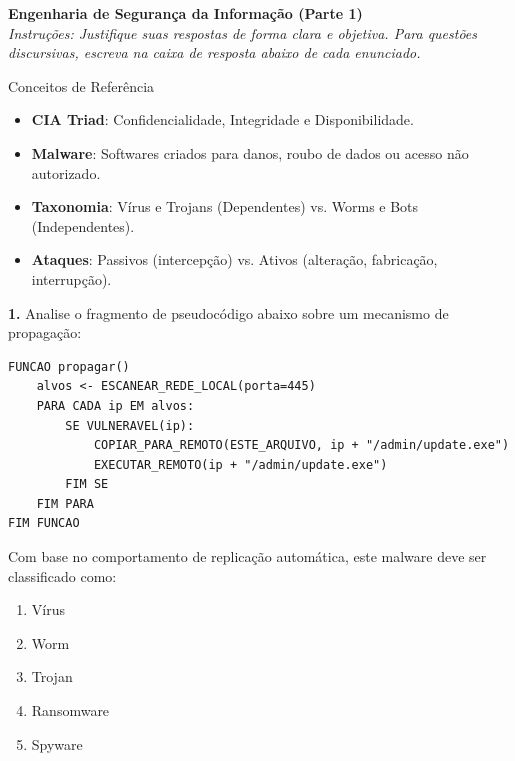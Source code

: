 \documentclass[12pt]{article}
\begin{document}

\vspace*{0.2cm}

\begin{center}
  {\Large \textbf{Engenharia de Segurança da Informação (Parte 1)}}\\[0.2cm]
  \textit{Instruções: Justifique suas respostas de forma clara e objetiva.
  Para questões discursivas, escreva na caixa de resposta abaixo de cada enunciado.}
\end{center}

\vspace{0.4cm}

\begin{block}{Conceitos de Referência}
  \small
  \begin{itemize}
    \item \textbf{CIA Triad}: Confidencialidade, Integridade e Disponibilidade.
    \item \textbf{Malware}: Softwares criados para danos, roubo de dados ou acesso não autorizado.
    \item \textbf{Taxonomia}: Vírus e Trojans (Dependentes) vs. Worms e Bots (Independentes).
    \item \textbf{Ataques}: Passivos (intercepção) vs. Ativos (alteração, fabricação, interrupção).
  \end{itemize}
\end{block}

\vspace{0.5cm}

\noindent \textbf{1.} Analise o fragmento de pseudocódigo abaixo sobre um mecanismo de propagação:

\begin{lstlisting}
FUNCAO propagar()
    alvos <- ESCANEAR_REDE_LOCAL(porta=445)
    PARA CADA ip EM alvos:
        SE VULNERAVEL(ip):
            COPIAR_PARA_REMOTO(ESTE_ARQUIVO, ip + "/admin/update.exe")
            EXECUTAR_REMOTO(ip + "/admin/update.exe")
        FIM SE
    FIM PARA
FIM FUNCAO
\end{lstlisting}

Com base no comportamento de replicação automática, este malware deve ser classificado como:
\begin{enumerate}[label=(\Alph*)]
    \item Vírus
    \item Worm
    \item Trojan
    \item Ransomware
    \item Spyware
\end{enumerate}
\end{document}
